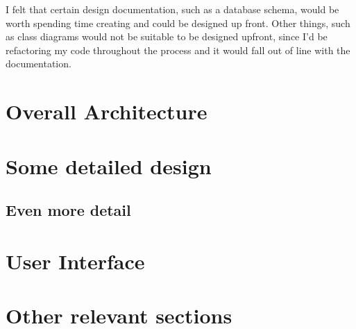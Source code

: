 I felt that certain design documentation, such as a database schema, would be worth spending time creating and could be designed up front. Other things, such as class diagrams would not be suitable to be designed upfront, since I'd be refactoring my code throughout the process and it would fall out of line with the documentation.

\section{Overall Architecture}

\section{Some detailed design}

\subsection{Even more detail}

\section{User Interface}

\section{Other relevant sections}